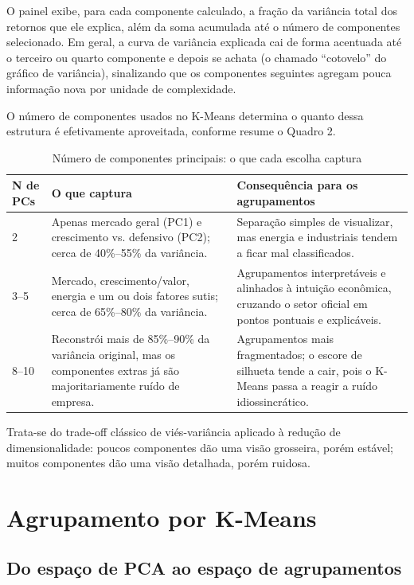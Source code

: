 \documentclass[12pt,oneside,a4paper,brazil,sumario=tradicional]{abntex2}
\begin{document}
O painel exibe, para cada componente calculado, a fração da variância total dos
retornos que ele explica, além da soma acumulada até o número de componentes
selecionado. Em geral, a curva de variância explicada cai de forma acentuada até
o terceiro ou quarto componente e depois se achata (o chamado ``cotovelo'' do
gráfico de variância), sinalizando que os componentes seguintes agregam pouca
informação nova por unidade de complexidade.

O número de componentes usados no K-Means determina o quanto dessa estrutura é
efetivamente aproveitada, conforme resume o Quadro 2.

\begin{table}[htb]
\caption{Número de componentes principais: o que cada escolha captura}
\centering
\begin{tabular}{p{1.6cm}p{5.3cm}p{6.6cm}}
\toprule
\textbf{N\textordmasculine{} de PCs} & \textbf{O que captura} & \textbf{Consequência para os agrupamentos} \\
\midrule
2 & Apenas mercado geral (PC1) e crescimento vs. defensivo (PC2); cerca de
40\%--55\% da variância. & Separação simples de visualizar, mas energia e
industriais tendem a ficar mal classificados. \\
3--5 & Mercado, crescimento/valor, energia e um ou dois fatores sutis; cerca de
65\%--80\% da variância. & Agrupamentos interpretáveis e alinhados à intuição
econômica, cruzando o setor oficial em pontos pontuais e explicáveis. \\
8--10 & Reconstrói mais de 85\%--90\% da variância original, mas os componentes
extras já são majoritariamente ruído de empresa. & Agrupamentos mais
fragmentados; o escore de silhueta tende a cair, pois o K-Means passa a reagir a
ruído idiossincrático. \\
\bottomrule
\end{tabular}
\vspace{2mm}
\end{table}

Trata-se do trade-off clássico de viés-variância aplicado à redução de
dimensionalidade: poucos componentes dão uma visão grosseira, porém estável;
muitos componentes dão uma visão detalhada, porém ruidosa.

\section{Agrupamento por K-Means}

\subsection{Do espaço de PCA ao espaço de agrupamentos}
\end{document}
